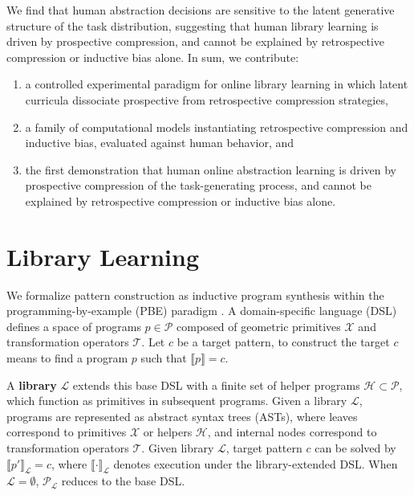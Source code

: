 \documentclass{article}
\begin{document}
We find that human abstraction decisions are sensitive to the latent generative structure of the task distribution, suggesting that human library learning is driven by prospective compression, and cannot be explained by retrospective compression or inductive bias alone.
%
In sum, we contribute: 
\begin{enumerate}
    \item a controlled experimental paradigm for online library 
    learning in which latent curricula dissociate prospective from retrospective compression strategies,
    \item %
    a family of computational models instantiating retrospective 
    compression and inductive bias, evaluated against human behavior, and
    \item the first demonstration that human online abstraction 
    learning is driven by prospective compression of the 
    task-generating process, and cannot be explained by retrospective 
    compression or inductive bias alone.
\end{enumerate}


\section{Library Learning}\label{sec:formalism}


We formalize pattern construction as inductive program synthesis within the programming-by-example (PBE) paradigm \cite{gulwani2017program}. A domain-specific language (DSL) defines a space of programs $p \in \mathcal{P}$ composed of geometric primitives $\mathcal{X}$ and transformation operators $\mathcal{T}$.  Let $c$ be a target pattern, to construct the target $c$ means to find a program $p$ such that $\llbracket p \rrbracket = c$.

A \textbf{library} $\mathcal{L}$ extends this base DSL with a finite set of helper programs $\mathcal{H} \subset \mathcal{P}$, which function as primitives in subsequent programs. Given a library $\mathcal{L}$, programs are represented as abstract syntax trees (ASTs), where leaves correspond to primitives $\mathcal{X}$ or helpers $\mathcal{H}$, and internal nodes correspond to transformation
operators $\mathcal{T}$.
Given library $\mathcal{L}$, target pattern $c$ can be solved by $\llbracket p' \rrbracket_{\mathcal{L}} = c$, where $\llbracket \cdot \rrbracket_{\mathcal{L}}$ denotes execution under the library-extended DSL. When $\mathcal{L} = \emptyset$,  $\mathcal{P}_{\mathcal{L}}$ reduces to the base DSL. 
\end{document}
